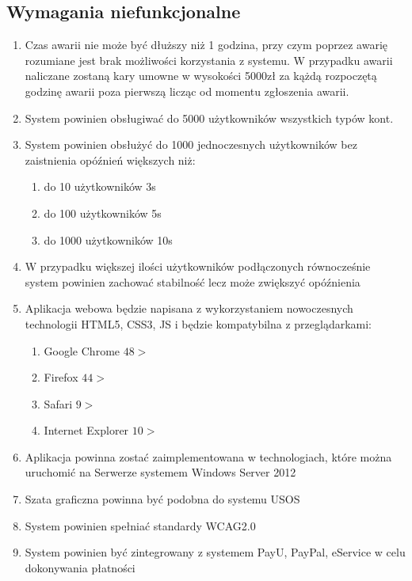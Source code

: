 \documentclass{article}
\begin{document}
\subsection{Wymagania niefunkcjonalne}
\begin{enumerate}
	\item Czas awarii nie może być dłuższy niż 1 godzina, przy czym poprzez awarię rozumiane jest brak możliwości korzystania z systemu. W przypadku awarii naliczane zostaną kary umowne w wysokości 5000zł za kążdą rozpoczętą godzinę awarii poza pierwszą licząc od momentu zgłoszenia awarii.
	\item System powinien obsługiwać do 5000 użytkowników wszystkich typów kont.
	\item System powinien obsłużyć do 1000 jednoczesnych użytkowników bez zaistnienia opóźnień większych niż:
	\begin{enumerate}
		\item 	do 10 użytkowników 3s
		\item do 100 użytkowników 5s
		\item do 1000 użytkowników 10s
	\end{enumerate}
	\item W przypadku większej ilości użytkowników podłączonych równocześnie system powinien zachować stabilność lecz może zwiększyć opóźnienia
	\item Aplikacja webowa będzie napisana z wykorzystaniem nowoczesnych technologii HTML5, CSS3, JS i będzie kompatybilna z przeglądarkami:
	\begin{enumerate}
		\item Google Chrome $48>$
		\item Firefox $44>$
		\item Safari $9>$
		\item Internet Explorer $10>$
	\end{enumerate}
	\item Aplikacja powinna zostać zaimplementowana w technologiach, które można uruchomić na Serwerze systemem Windows Server 2012
	\item Szata graficzna powinna być podobna do systemu USOS
	\item System powinien spełniać standardy WCAG2.0
	\item System powinien być zintegrowany z systemem PayU, PayPal, eService w celu dokonywania płatności

\end{enumerate}
\end{document}
